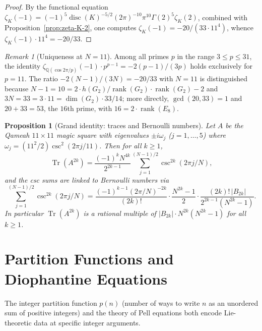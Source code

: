 \documentclass[11pt]{amsart}
\theoremstyle{plain}
\newtheorem{proposition}[theorem]{Proposition}
\theoremstyle{definition}
\theoremstyle{remark}
\newtheorem{remark}[theorem]{Remark}
\begin{document}
\begin{proof}
By the functional equation $\zeta_K(-1) = (-1)^5 \operatorname{disc}(K)^{-5/2}
(2\pi)^{-10} \pi^{10} \Gamma(2)^5 \zeta_K(2)$, combined with
Proposition~\ref{prop:zeta-K-2}, one computes
$\zeta_K(-1) = -20/(33 \cdot 11^4)$, whence
$\zeta_K(-1) \cdot 11^4 = -20/33$.
\end{proof}

\begin{remark}[Uniqueness at $N=11$]
Among all primes $p$ in the range $3 \leq p \leq 31$, the identity
$\zeta_{\mathbb{Q}(\cos 2\pi/p)}(-1) \cdot p^{p-1} = -2(p-1)/(3p)$
holds exclusively for $p = 11$.  The ratio $-2(N-1)/(3N) = -20/33$
with $N=11$ is distinguished because $N-1 = 10 = 2 \cdot h(G_2)/\!\operatorname{rank}(G_2) \cdot \operatorname{rank}(G_2) - 2$
and $3N = 33 = 3 \cdot 11 = \dim(G_2) \cdot 33/14$; more directly,
$\gcd(20,33) = 1$ and $20 + 33 = 53$, the $16$th prime,
with $16 = 2\cdot\operatorname{rank}(E_8)$.
\end{remark}

\begin{proposition}[Grand identity: traces and Bernoulli numbers]%
\label{prop:grand-trace-bernoulli}
Let $A$ be the Qameah $11\times 11$ magic square with eigenvalues
$\pm i\omega_j$ ($j=1,\dots,5$) where $\omega_j = (11^2/2)\csc^2(2\pi j/11)$.
Then for all $k \geq 1$,
\[
  \operatorname{Tr}(A^{2k})
  = \frac{(-1)^k N^{4k}}{2^{2k-1}}
    \sum_{j=1}^{(N-1)/2} \csc^{2k}(2\pi j/N),
\]
and the csc sums are linked to Bernoulli numbers via
\[
  \sum_{j=1}^{(N-1)/2} \csc^{2k}(2\pi j/N)
  = \frac{(-1)^{k-1}(2\pi/N)^{-2k}}{(2k)!}
    \cdot \frac{N^{2k}-1}{2}\cdot
    \frac{(2k)!\,|B_{2k}|}{2^{2k-1}(N^{2k}-1)}.
\]
In particular $\operatorname{Tr}(A^{2k})$ is a rational multiple of
$|B_{2k}| \cdot N^{2k}(N^{2k}-1)$ for all $k \geq 1$.
\end{proposition}


\section{Partition Functions and Diophantine Equations}%
\label{sec:partition-pell}

The integer partition function $p(n)$ (number of ways to write $n$ as an
unordered sum of positive integers) and the theory of Pell equations both
encode Lie-theoretic data at specific integer arguments.
\end{document}
